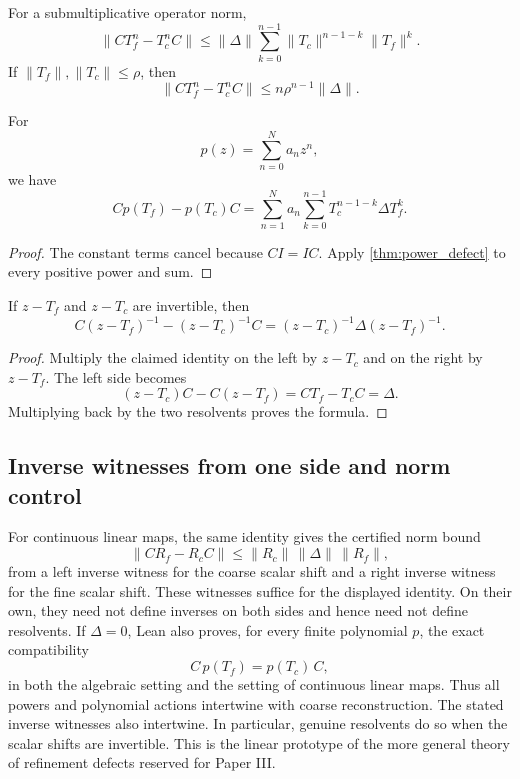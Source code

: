 \begin{corollary}\label{cor:defect-norm}
For a submultiplicative operator norm,
\[
\|CT_f^n-T_c^nC\|
\le
\|\Delta\|
\sum_{k=0}^{n-1}
\|T_c\|^{n-1-k}\|T_f\|^k.
\]
If $\|T_f\|,\|T_c\|\le\rho$, then
\[
\boxed{
\|CT_f^n-T_c^nC\|
\le n\rho^{n-1}\|\Delta\|.
}
\]
\end{corollary}

\begin{corollary}\label{cor:polynomial_defect}
For
\[
p(z)=\sum_{n=0}^Na_nz^n,
\]
we have
\[
Cp(T_f)-p(T_c)C
=
\sum_{n=1}^Na_n
\sum_{k=0}^{n-1}T_c^{n-1-k}\Delta T_f^k.
\]
\end{corollary}

\begin{proof}
The constant terms cancel because $CI=IC$.  Apply \cref{thm:power_defect} to every positive power and sum.
\end{proof}

\begin{theorem}\label{thm:resolvent_defect}\label{thm:resolvent-defect}
If $z-T_f$ and $z-T_c$ are invertible, then
\[
C(z-T_f)^{-1}-(z-T_c)^{-1}C
=
(z-T_c)^{-1}\Delta(z-T_f)^{-1}.
\]
\end{theorem}

\begin{proof}
Multiply the claimed identity on the left by $z-T_c$ and on the right by $z-T_f$.  The left side becomes
\[
(z-T_c)C-C(z-T_f)
=
CT_f-T_cC
=
\Delta.
\]
Multiplying back by the two resolvents proves the formula.
\end{proof}

\subsection{Inverse witnesses from one side and norm control}
For continuous linear maps, the same identity gives the certified norm bound
\[
\boxed{
\|C R_f-R_c C\|
\le \|R_c\|\,\|\Delta\|\,\|R_f\|,
}
\]
from a left inverse witness for the coarse scalar shift and a right inverse
witness for the fine scalar shift. These witnesses suffice for the displayed
identity. On their own, they need not define inverses on both sides and hence
need not define resolvents. If $\Delta=0$, Lean also proves, for every finite
polynomial $p$, the exact compatibility
\[
\boxed{C\,p(T_f)=p(T_c)\,C,}
\]
in both the algebraic setting and the setting of continuous linear maps. Thus
all powers and polynomial actions intertwine with coarse reconstruction. The
stated inverse witnesses also intertwine. In particular, genuine resolvents
do so when the scalar shifts are invertible. This is the linear prototype
of the more general theory of refinement defects reserved for Paper III.

